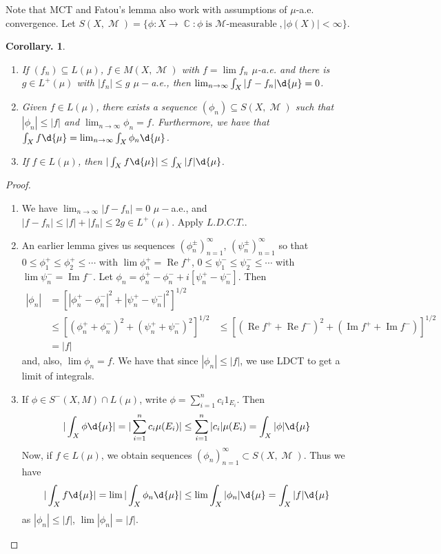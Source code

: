 \documentclass[11pt, a4paper]{memoir}
\DeclareMathOperator{\C}{{\mathbb{C}}}
\theoremstyle{change}
\newtheorem{corollary}[theorem]{Corollary.}
\theoremstyle{plain}
\theoremstyle{nonumberplain}
\newtheorem{proof}{Proof}
\DeclareMathOperator{\M}{{\mathcal{M}}}
\renewcommand{\Re}{\ensuremath{\operatorname{Re}}}
\renewcommand{\Im}{\ensuremath{\operatorname{Im}}}
\begin{document}
Note that MCT and Fatou's lemma also work with assumptions of $\mu$-a.e. convergence.
Let $S(X,\M)=\{\phi:X\to\C:\phi\text{is $\M$-measurable},|\phi(X)|<\infty\}$.
\begin{corollary}
    \begin{enumerate}[nolistsep]
        \item If $(f_n)\subseteq L(\mu)$, $f\in M(X,\M)$ with $f=\lim f_n$ $\mu$-a.e. and there is $g\in L^+(\mu)$ with $|f_n|\leq g$ $\mu-$a.e., then $\lim_{n\to\infty}\int_X|f-f_n|\d{\mu}=0$.
        \item Given $f\in L(\mu)$, there exists a sequence $(\phi_n)\subseteq S(X,\M)$ such that $|\phi_n|\leq|f|$ and $\lim_{n\to\infty}\phi_n=f$.
            Furthermore, we have that $\int_Xf\d{\mu}=\lim_{n\to\infty}\int_X\phi_n\d{\mu}$.
        \item If $f\in L(\mu)$, then $|\int_Xf\d{\mu}|\leq\int_X|f|\d{\mu}$.
    \end{enumerate}
\end{corollary}
\begin{proof}
    \begin{enumerate}
        \item We have $\lim_{n\to\infty}|f-f_n|=0$ $\mu-$a.e., and $|f-f_n|\leq|f|+|f_n|\leq 2g\in L^+(\mu)$.
            Apply $L.D.C.T.$.
        \item An earlier lemma gives us sequences $(\phi_n^\pm)_{n=1}^\infty$, $(\psi_n^\pm)_{n=1}^\infty$ so that $0\leq\phi_1^+\leq\phi_2^+\leq\cdots$ with $\lim\phi_n^+=\Re f^+$, $0\leq\psi_1^-\leq\psi_2^-\leq\cdots$ with $\lim \psi_n^-=\Im f^-$.
            Let $\phi_n=\phi_n^+-\phi_n^-+i[\psi_n^+-\psi_n^-]$.
            Then
            \begin{align*}
                |\phi_n|&=[|\phi_n^+-\phi_n^-|^2+|\psi_n^+-\psi_n^-|^2]^{1/2}\\
                        &\leq[(\phi_n^++\phi_n^-)^2+(\psi_n^++\psi_n^-)^2]^{1/2}
                        &\leq\left[(\Re f^++\Re f^-)^2+(\Im f^++\Im f^-)\right]^{1/2}\\
                        &= |f|
            \end{align*}
            and, also, $\lim\phi_n=f$.
            We have that since $|\phi_n|\leq|f|$, we use LDCT to get a limit of integrals.
        \item If $\phi\in S^-(X,M)\cap L(\mu)$, write $\phi=\sum_{i=1}^nc_i1_{E_i}$.
            Then
            \begin{equation*}
                |\int_X\phi\d{\mu}|=|\sum_{i=1}^nc_i\mu(E_i)|\leq\sum_{i=1}^n|c_i|\mu(E_i)=\int_X|\phi|\d{\mu}
            \end{equation*}
            Now, if $f\in L(\mu)$, we obtain sequences $(\phi_n)_{n=1}^\infty\subset S(X,\M)$.
            Thus we have
            \begin{equation*}
                |\int_Xf\d{\mu}|=\lim|\int_X\phi_n\d{\mu}|\leq\lim\int_X|\phi_n|\d{\mu}=\int_X|f|\d{\mu}
            \end{equation*}
            as $|\phi_n|\leq|f|$, $\lim |\phi_n|=|f|$.
    \end{enumerate}
\end{proof}
\end{document}
